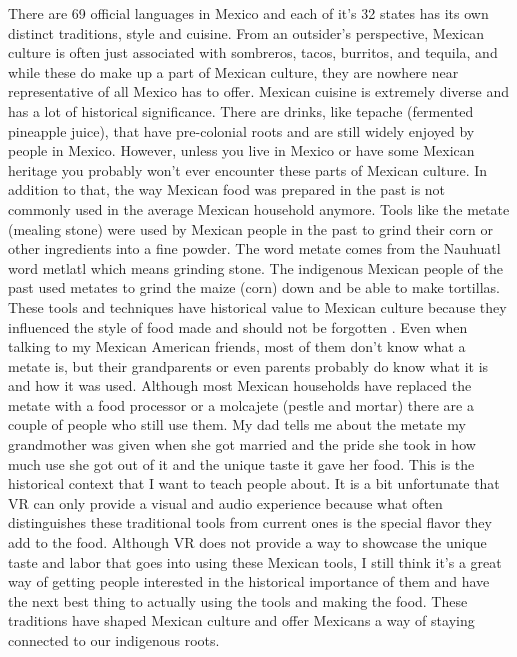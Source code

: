 \documentclass[10pt,twocolumn]{article}
\begin{document}
There are 69 official languages in Mexico and each of it’s 32 states has its own distinct traditions, style and cuisine. From an outsider’s perspective, Mexican culture is often just associated with sombreros, tacos, burritos, and tequila, and while these do make up a part of Mexican culture, they are nowhere near representative of all Mexico has to offer. Mexican cuisine is extremely diverse and has a lot of historical significance. There are drinks, like tepache (fermented pineapple juice), that have pre-colonial roots and are still widely enjoyed by people in Mexico. However, unless you live in Mexico or have some Mexican heritage you probably won’t ever encounter these parts of Mexican culture. In addition to that, the way Mexican food was prepared in the past is not commonly used in the average Mexican household anymore. Tools like the metate (mealing stone) were used by Mexican people in the past to grind their corn or other ingredients into a fine powder. The word metate comes from the Nauhuatl word metlatl which means grinding stone. The indigenous Mexican people of the past used metates to grind the maize (corn) down and be able to make tortillas. These tools and techniques have historical value to Mexican culture because they influenced the style of food made and should not be forgotten . Even when talking to my Mexican American friends, most of them don’t know what a metate is, but their grandparents or even parents probably do know what it is and how it was used. Although most Mexican households have replaced the metate with a food processor or a molcajete (pestle and mortar) there are a couple of people who still use them. My dad tells me about the metate my grandmother was given when she got married and the pride she took in how much use she got out of it and the unique taste it gave her food. This is the historical context that I want to teach people about. It is a bit unfortunate that VR can only provide a visual and audio experience because what often distinguishes these traditional tools from current ones is the special flavor they add to the food. Although VR does not provide a way to showcase the unique taste and labor that goes into using these Mexican tools, I still think it’s a great way of getting people interested in the historical importance of them and have the next best thing to actually using the tools and making the food. These traditions have shaped Mexican culture and offer Mexicans a way of staying connected to our indigenous roots. 
 
\end{document}
